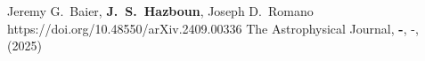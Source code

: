          {Jeremy G.~{Baier}, \textbf{J.~S.~Hazboun}, Joseph D.~{Romano}}
         {https://doi.org/10.48550/arXiv.2409.00336}
         {{The Astrophysical Journal}, \textbf{-}, -, (2025)}

